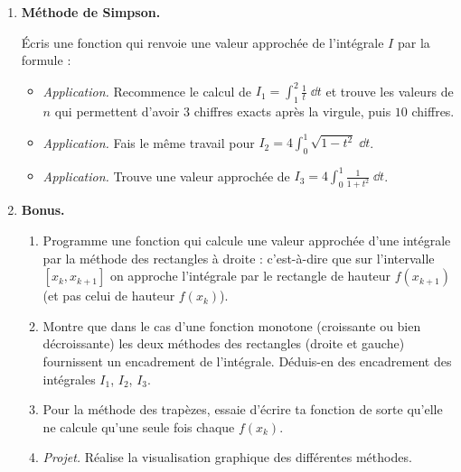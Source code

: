 \documentclass[11pt,class=report,crop=false]{standalone}
\begin{document}
\begin{activite}
\begin{enumerate}
\begin{itemize}
   
  \end{itemize}
  
   
  \item  \textbf{Méthode de Simpson.}  
  
  \'Ecris une fonction  qui renvoie une valeur approchée de l'intégrale $I$ par la formule :
  
  \begin{itemize}
  \item \emph{Application.} Recommence le calcul de $I_1 = \int_{1}^{2} \frac 1t \; \dd t$ et trouve les valeurs de $n$ qui permettent d'avoir $3$ chiffres exacts après la virgule, puis $10$ chiffres.
  
  \item \emph{Application.} Fais le même travail pour $I_2 = 4 \int_0^1 \sqrt{1-t^2} \; \dd t$.
   
  \item \emph{Application.} Trouve une valeur approchée de $I_3 = 4\int_0^1 \frac{1}{1+t^2} \; \dd t$. 
  \end{itemize}  
  
  \item \textbf{Bonus.}
  \begin{enumerate}
  
    \item     
    \begin{minipage}[t]{0.6\textwidth}    
   Programme une fonction qui calcule une valeur approchée d'une intégrale par la méthode des rectangles à droite : c'est-à-dire que sur l'intervalle $[x_k,x_{k+1}]$ on approche l'intégrale par le rectangle de hauteur $f(x_{k+1})$ (et pas celui de hauteur $f(x_k)$). 
   \end{minipage}
   \begin{minipage}[c]{0.25\textwidth}      
	\end{minipage}

  \item Montre que dans le cas d'une fonction monotone (croissante ou bien décroissante) les deux méthodes des rectangles (droite et gauche) fournissent un encadrement de l'intégrale. Déduis-en des encadrement des intégrales $I_1$, $I_2$, $I_3$.
  
  
  
 \item Pour la méthode des trapèzes, essaie d'écrire ta fonction de sorte qu'elle ne calcule  qu'une seule fois chaque $f(x_k)$.
 
 \item \emph{Projet.} Réalise la visualisation graphique des différentes méthodes.
  \end{enumerate} 
\end{enumerate} 

\end{activite}
\end{document}
